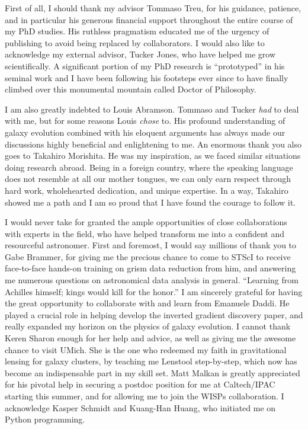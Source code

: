 
First of all, I should thank my advisor Tommaso Treu, for his guidance, patience, and in particular his generous financial
support throughout the entire course of my PhD studies.
His ruthless pragmatism educated me of the urgency of publishing to avoid being replaced by collaborators.
I would also like to acknowledge my external advisor, Tucker Jones, who have helped me grow scientifically.
A significant portion of my PhD research is ``prototyped'' in his seminal work and I have been following his footsteps
ever since to have finally climbed over this monumental mountain called Doctor of Philosophy.

I am also greatly indebted to Louis Abramson. Tommaso and Tucker \emph{had} to deal with me, but for some reasons Louis \emph{chose} to.
His profound understanding of galaxy evolution combined with his eloquent arguments has always made our discussions highly
beneficial and enlightening to me.
An enormous thank you also goes to Takahiro Morishita.
He was my inspiration, as we faced similar situations doing research abroad.
Being in a foreign country, where the speaking language does not resemble at all our mother tongues,
we can only earn respect through hard work, wholehearted dedication, and unique expertise.
In a way, Takahiro showed me a path and I am so proud that I have found the courage to follow it.

I would never take for granted the ample opportunities of close collaborations with experts in the field, who have
helped transform me into a confident and resourceful astronomer.
First and foremost, I would say millions of thank you to Gabe Brammer, for giving me the precious chance to come to STScI to
receive face-to-face hands-on training on grism data reduction from him, and answering me numerous questions on
astronomical data analysis in general.  ``Learning from Achilles himself; kings would kill for the honor.'' I am
sincerely grateful for having the great opportunity to collaborate with and learn from Emanuele Daddi.  He played
a crucial role in helping develop the inverted gradient discovery paper, and really expanded my horizon on the
physics of galaxy evolution. I cannot thank Keren Sharon enough for her help and advice, as well as giving me the
awesome chance to visit UMich.  She is the one who redeemed my faith in gravitational lensing
for galaxy clusters, by teaching me Lenstool step-by-step, which now has become an indispensable part in my skill
set.  Matt Malkan is greatly appreciated for his pivotal help in securing a postdoc position for me at
Caltech/IPAC starting this summer, and for allowing me to join the WISPs collaboration.  I acknowledge Kasper
Schmidt and Kuang-Han Huang, who initiated me on Python programming.

